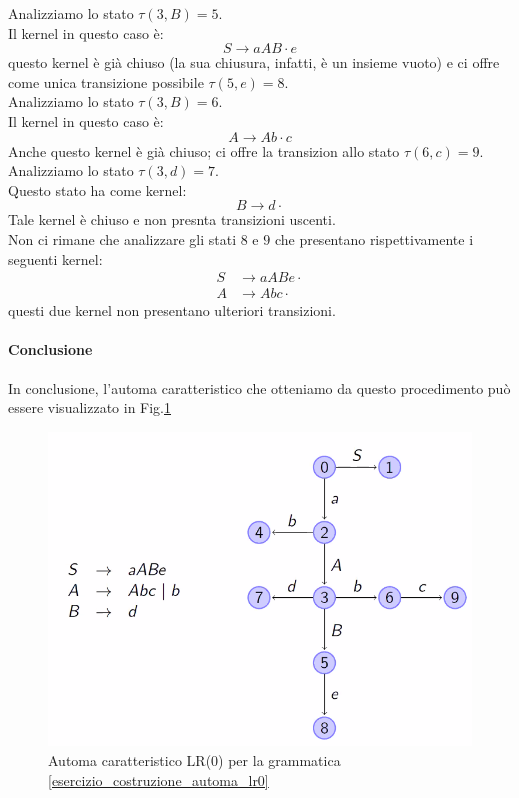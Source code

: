 \documentclass[class=book, crop=false, oneside, 12pt]{standalone}
\begin{document}
Analizziamo lo stato \(\tau (3, B) = 5\). \\
Il kernel in questo caso è:
\begin{equation*}
    S \to aAB \cdot e
\end{equation*}
questo kernel è già chiuso (la sua chiusura, infatti, è un insieme vuoto) e ci offre come unica transizione possibile \(\tau (5, e) = 8\). \\

Analizziamo lo stato \(\tau (3, B) = 6\). \\
Il kernel in questo caso è:
\begin{equation*}
    A \to Ab \cdot c
\end{equation*}
Anche questo kernel è già chiuso; ci offre la transizion allo stato \(\tau (6, c) = 9\). \\

Analizziamo lo stato \(\tau (3, d) = 7\). \\
Questo stato ha come kernel:
\begin{equation*}
    B \to d \cdot 
\end{equation*}
Tale kernel è chiuso e non presnta transizioni uscenti. \\

Non ci rimane che analizzare gli stati \(8\) e \(9\) che presentano rispettivamente i seguenti kernel:
\begin{align*}
    S &\to aABe \cdot \\
    A &\to Abc \cdot
\end{align*}
questi due kernel non presentano ulteriori transizioni.

\paragraph{Conclusione}
In conclusione, l'automa caratteristico che otteniamo da questo procedimento può essere visualizzato in Fig.\ref{charateristic-automata_cosntruction}
\begin{figure}
    \centering
    \includegraphics[width=.8\textwidth]{charateristic-automata_cosntruction.png}
    \caption{Automa caratteristico LR(0) per la grammatica \ref{esercizio_costruzione_automa_lr0}}
    \label{charateristic-automata_cosntruction}    
\end{figure}
\end{document}
